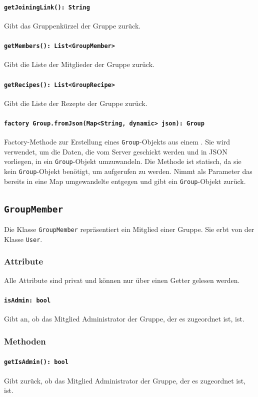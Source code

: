 \documentclass{entwurfsheft}
\begin{document}
\paragraph{\texttt{getJoiningLink(): String}}
Gibt das Gruppenkürzel der Gruppe zurück.
\paragraph{\texttt{getMembers(): List<GroupMember>}}
Gibt die Liste der Mitglieder der Gruppe zurück.
\paragraph{\texttt{getRecipes(): List<GroupRecipe>}}
Gibt die Liste der Rezepte der Gruppe zurück.
\paragraph{\texttt{factory Group.fromJson(Map<String, dynamic> json): Group}} Factory-Methode zur Erstellung eines \texttt{Group}-Objekts aus einem . Sie wird verwendet, um die Daten, die vom Server geschickt werden und in \Gls{JSON} vorliegen, in ein \texttt{Group}-Objekt umzuwandeln. Die Methode ist statisch, da sie kein \texttt{Group}-Objekt benötigt, um aufgerufen zu werden. Nimmt als Parameter das bereits in eine Map umgewandelte  entgegen und gibt ein \texttt{Group}-Objekt zurück.

\newpage
\subsection{\texttt{GroupMember}}\label{sec:GroupMember}
Die Klasse \texttt{GroupMember} repräsentiert ein Mitglied einer Gruppe. Sie erbt von der Klasse \texttt{User}.
\subsubsection*{Attribute}
Alle Attribute sind privat und können nur über einen Getter gelesen werden.
\paragraph{\texttt{isAdmin: bool}}
Gibt an, ob das Mitglied Administrator der Gruppe, der es zugeordnet ist, ist.
\subsubsection*{Methoden}
\paragraph{\texttt{getIsAdmin(): bool}}
Gibt zurück, ob das Mitglied Administrator der Gruppe, der es zugeordnet ist, ist.
\end{document}
